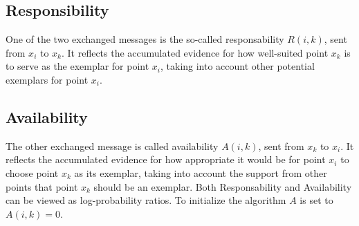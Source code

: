 \documentclass[11pt,a4paper]{article}
\begin{document}
\subsection{Responsibility}
One of the two exchanged messages is the so-called responsability $R(i,k)$, sent from $x_i$ to $x_k$. It reflects the accumulated evidence for how well-suited point $x_k$ is to serve as the exemplar for point $x_i$, taking into account other potential exemplars for point $x_i$. \cite{frey2007clustering}
\subsection{Availability}
The other exchanged message is called availability $A(i,k)$, sent from $x_k$ to $x_i$. It reflects the accumulated evidence for how appropriate it would be for point $x_i$ to choose point $x_k$ as its exemplar, taking into account the support from other points that point $x_k$ should be an exemplar. Both Responsability and Availability can be viewed as log-probability ratios. To initialize the algorithm $A$ is set to $A(i,k) = 0$. \cite{frey2007clustering}
\pagebreak
\end{document}
